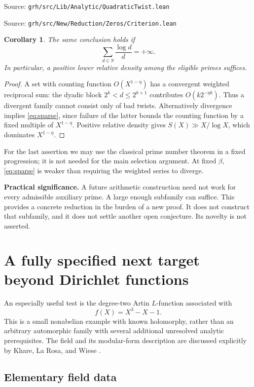 \documentclass[11pt,letterpaper]{article}
\newtheorem{corollary}[theorem]{Corollary}
\theoremstyle{definition}
\theoremstyle{remark}
\newcommand{\src}[1]{\par{\small\color{navy}Source: \nolinkurl{grh/src/#1}}\par}
\begin{document}
\src{Lib/Analytic/QuadraticTwist.lean}
\src{New/Reduction/Zeros/Criterion.lean}

\begin{corollary}\label{cor:divergence}
The same conclusion holds if
\[
 \sum_{d\in S}\frac{\log d}{d}=+\infty.
\]
In particular, a positive lower relative density among the eligible
primes suffices.
\end{corollary}
\begin{proof}
A set with counting function \(O(X^{1-\eta})\) has a convergent
weighted reciprocal sum: the dyadic block \(2^k<d\le2^{k+1}\)
contributes \(O(k2^{-\eta k})\). Thus a divergent family cannot
consist only of bad twists. Alternatively divergence implies
\eqref{eq:sparse}, since failure of the latter bounds the counting
function by a fixed multiple of \(X^{1-\eta}\). Positive relative
density gives \(S(X)\gg X/\log X\), which dominates
\(X^{1-\eta}\).
\end{proof}

For the last assertion we may use the classical prime number theorem
in a fixed progression; it is not needed for the main selection argument.
At fixed \(\beta\), \eqref{eq:sparse} is weaker than requiring the
weighted series to diverge.

\textbf{Practical significance.} A future arithmetic construction need
not work for every admissible auxiliary prime. A large enough
subfamily can suffice. This provides a concrete reduction in the
burden of a new proof. It does not construct that subfamily, and it
does not settle another open conjecture. Its novelty is not asserted.

\section{A fully specified next target beyond Dirichlet functions}
\label{sec:s3}

An especially useful test is the degree-two Artin \(L\)-function
associated with
\[
 f(X)=X^3-X-1.
\]
This is a small nonabelian example with known holomorphy, rather than
an arbitrary automorphic family with several additional unresolved
analytic prerequisites. The field and its modular-form description
are discussed explicitly by Khare, La Rosa, and Wiese
\cite[Section 1, the case \(n=3\)]{khare}.

\subsection{Elementary field data}
\end{document}
